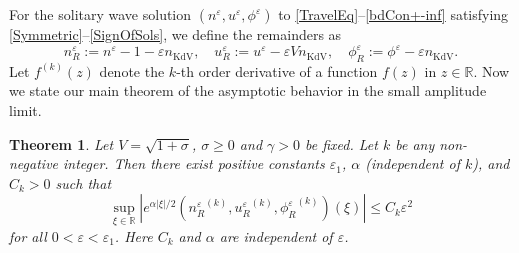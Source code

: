 \documentclass{amsart}
\newcommand{\veps}{\varepsilon}
\numberwithin{equation}{section}
\theoremstyle{plain}%
\newtheorem{theorem}{Theorem}[section]
\theoremstyle{definition}
\theoremstyle{remark}
\theoremstyle{remark}
\begin{document}
For the solitary wave solution $(n^\veps,u^\veps,\phi^\veps)$ to \eqref{TravelEq}--\eqref{bdCon+-inf} satisfying \eqref{Symmetric}--\eqref{SignOfSols}, we define the remainders as
\begin{equation}\label{Def nR uR phiR}
n_{R}^\veps:= n^\veps - 1 - \veps n_{\text{KdV}},\quad u_{R}^\veps := u^\veps - \veps Vn_{\text{KdV}},\quad \phi_{R}^\veps := \phi^\veps - \veps n_{\text{KdV}}.
\end{equation}
Let $f^{(k)}(z)$ denote the $k$-th order derivative of a function $f(z)$ in $z\in\mathbb{R}$.
Now we state our main theorem of the asymptotic behavior in the small amplitude limit. 
\begin{theorem}\label{MainThm3}
Let  $V=\sqrt{1+\sigma}$,
 $\sigma \geq 0$ and $\gamma>0$ be fixed. Let $k$ be any non-negative integer. Then there exist positive constants $\veps_1$, $\alpha$ (independent of $k$), and $C_{k}>0$ such that 
\begin{equation}\label{pointestimate}
  \sup_{\xi\in \mathbb{R}} \left|e^{\alpha|\xi|/2}   ({n_R^\veps}^{(k)}, {u_R^\veps}^{(k)} , {\phi_R^\veps}^{(k)}) (\xi) \right| \leq C_{k}\veps^2 
\end{equation}
for all $0<\veps<\veps_1$. Here $C_{k}$ and $\alpha$ are independent of $\veps$.
\end{theorem}
\end{document}

